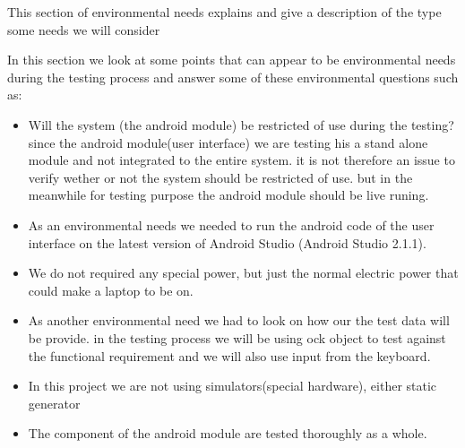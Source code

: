 This section of environmental needs explains and give a description of the type some needs  
we will consider 

In this section we look at some points that can appear to be environmental needs during the testing process and answer some of these environmental questions such as:

\begin{itemize}

     \item Will the system (the android module) be restricted of use during the testing? since the android module(user interface) we are testing his a stand alone module and not integrated to the entire system. it is not therefore an issue to verify wether or not the system should be restricted of use. but in the meanwhile for testing purpose the android module should be live runing.

     \item As an environmental needs we needed to run the android code of the user interface on  the latest version of Android Studio (Android Studio 2.1.1). 

      \item We do not required any special power, but just the normal electric power that could make a laptop to be on.

      \item  As another environmental need we had to look on how our the test data will be provide. in the testing process we will be using ock object to test against the functional requirement and we will also use input  from the keyboard. 
 
       \item In this project we are not using simulators(special hardware), either static generator

       \item The component of the android module are tested thoroughly as a whole.
\end{itemize}
  

 